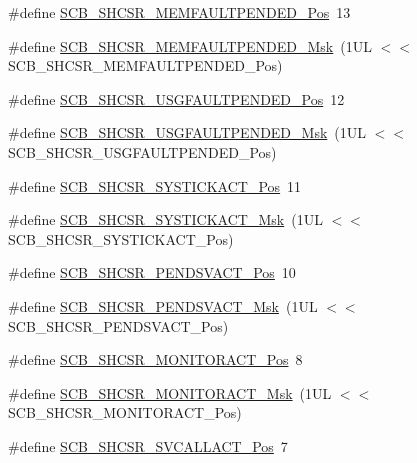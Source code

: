\begin{DoxyCompactItemize}
\item 
\#define \hyperlink{group__CMSIS__SCB_gaceb60fe2d8a8cb17fcd1c1f6b5aa924f}{S\-C\-B\-\_\-\-S\-H\-C\-S\-R\-\_\-\-M\-E\-M\-F\-A\-U\-L\-T\-P\-E\-N\-D\-E\-D\-\_\-\-Pos}~13
\item 
\#define \hyperlink{group__CMSIS__SCB_ga9abc6c2e395f9e5af4ce05fc420fb04c}{S\-C\-B\-\_\-\-S\-H\-C\-S\-R\-\_\-\-M\-E\-M\-F\-A\-U\-L\-T\-P\-E\-N\-D\-E\-D\-\_\-\-Msk}~(1\-U\-L $<$$<$ S\-C\-B\-\_\-\-S\-H\-C\-S\-R\-\_\-\-M\-E\-M\-F\-A\-U\-L\-T\-P\-E\-N\-D\-E\-D\-\_\-\-Pos)
\item 
\#define \hyperlink{group__CMSIS__SCB_ga3cf03acf1fdc2edc3b047ddd47ebbf87}{S\-C\-B\-\_\-\-S\-H\-C\-S\-R\-\_\-\-U\-S\-G\-F\-A\-U\-L\-T\-P\-E\-N\-D\-E\-D\-\_\-\-Pos}~12
\item 
\#define \hyperlink{group__CMSIS__SCB_ga122b4f732732010895e438803a29d3cc}{S\-C\-B\-\_\-\-S\-H\-C\-S\-R\-\_\-\-U\-S\-G\-F\-A\-U\-L\-T\-P\-E\-N\-D\-E\-D\-\_\-\-Msk}~(1\-U\-L $<$$<$ S\-C\-B\-\_\-\-S\-H\-C\-S\-R\-\_\-\-U\-S\-G\-F\-A\-U\-L\-T\-P\-E\-N\-D\-E\-D\-\_\-\-Pos)
\item 
\#define \hyperlink{group__CMSIS__SCB_gaec9ca3b1213c49e2442373445e1697de}{S\-C\-B\-\_\-\-S\-H\-C\-S\-R\-\_\-\-S\-Y\-S\-T\-I\-C\-K\-A\-C\-T\-\_\-\-Pos}~11
\item 
\#define \hyperlink{group__CMSIS__SCB_gafef530088dc6d6bfc9f1893d52853684}{S\-C\-B\-\_\-\-S\-H\-C\-S\-R\-\_\-\-S\-Y\-S\-T\-I\-C\-K\-A\-C\-T\-\_\-\-Msk}~(1\-U\-L $<$$<$ S\-C\-B\-\_\-\-S\-H\-C\-S\-R\-\_\-\-S\-Y\-S\-T\-I\-C\-K\-A\-C\-T\-\_\-\-Pos)
\item 
\#define \hyperlink{group__CMSIS__SCB_ga9b9fa69ce4c5ce7fe0861dbccfb15939}{S\-C\-B\-\_\-\-S\-H\-C\-S\-R\-\_\-\-P\-E\-N\-D\-S\-V\-A\-C\-T\-\_\-\-Pos}~10
\item 
\#define \hyperlink{group__CMSIS__SCB_gae0e837241a515d4cbadaaae1faa8e039}{S\-C\-B\-\_\-\-S\-H\-C\-S\-R\-\_\-\-P\-E\-N\-D\-S\-V\-A\-C\-T\-\_\-\-Msk}~(1\-U\-L $<$$<$ S\-C\-B\-\_\-\-S\-H\-C\-S\-R\-\_\-\-P\-E\-N\-D\-S\-V\-A\-C\-T\-\_\-\-Pos)
\item 
\#define \hyperlink{group__CMSIS__SCB_ga8b71cf4c61803752a41c96deb00d26af}{S\-C\-B\-\_\-\-S\-H\-C\-S\-R\-\_\-\-M\-O\-N\-I\-T\-O\-R\-A\-C\-T\-\_\-\-Pos}~8
\item 
\#define \hyperlink{group__CMSIS__SCB_gaad09b4bc36e9bccccc2e110d20b16e1a}{S\-C\-B\-\_\-\-S\-H\-C\-S\-R\-\_\-\-M\-O\-N\-I\-T\-O\-R\-A\-C\-T\-\_\-\-Msk}~(1\-U\-L $<$$<$ S\-C\-B\-\_\-\-S\-H\-C\-S\-R\-\_\-\-M\-O\-N\-I\-T\-O\-R\-A\-C\-T\-\_\-\-Pos)
\item 
\#define \hyperlink{group__CMSIS__SCB_ga977f5176be2bc8b123873861b38bc02f}{S\-C\-B\-\_\-\-S\-H\-C\-S\-R\-\_\-\-S\-V\-C\-A\-L\-L\-A\-C\-T\-\_\-\-Pos}~7
$$
\end{DoxyCompactItemize}
